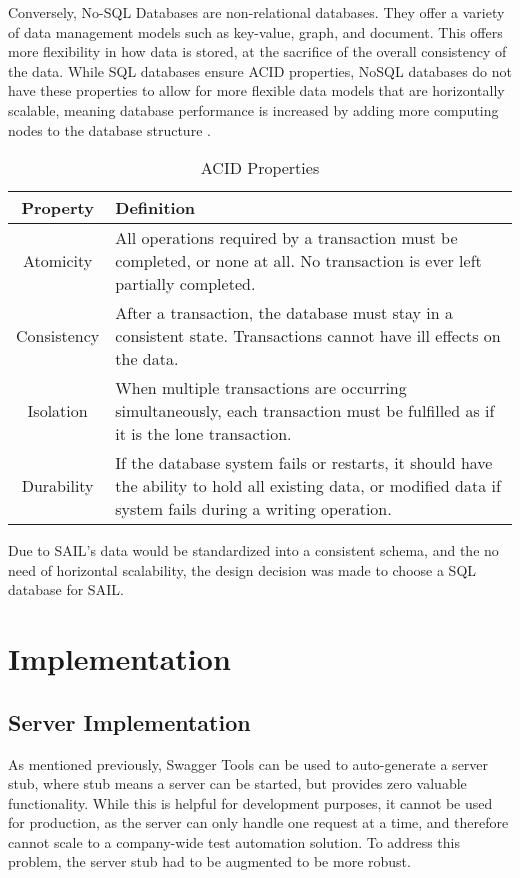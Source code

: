 \documentclass[10pt, titlepage, onecolumn, openany]{article}
\begin{document}
Conversely, No-SQL Databases are non-relational databases. They offer a variety
of data management models such as key-value, graph, and document. This offers
more flexibility in how data is stored, at the sacrifice of the overall consistency
of the data. While SQL databases ensure ACID properties, NoSQL databases do not
have these properties to allow for more flexible data models that are horizontally
scalable, meaning database performance is increased by adding more computing nodes
to the database structure \cite{awsNoSql}.
\begin{singlespace}
\begin{table}[H]
\caption{ACID Properties}
\centering
\begin{tabular}{|c|p{9cm}|}
    \hline
    \textbf{Property} & \textbf{Definition} \\
    \hline
    Atomicity & All operations required by a transaction must be completed, or
    none at all. No transaction is ever left partially completed. \\
    \hline
    Consistency & After a transaction, the database must stay in a consistent state.
    Transactions cannot have ill effects on the data. \\
    \hline
    Isolation & When multiple transactions are occurring simultaneously, each
    transaction must be fulfilled as if it is the lone transaction. \\
    \hline
    Durability &  If the database system fails or restarts, it should have the
    ability to hold all existing data, or modified data if system fails during a
    writing operation. \\
    \hline
\end{tabular}
\label{ACID}
\end{table}
\end{singlespace}

Due to SAIL's data would be standardized into a consistent schema, and the no need
of horizontal scalability, the design decision was made to choose a SQL database for SAIL.


\clearpage
\section{Implementation}
\subsection{Server Implementation}
As mentioned previously, Swagger Tools can be used to auto-generate
a server stub, where stub means a server can be started, but provides zero
valuable functionality. While this is helpful for development purposes, it cannot
be used for production, as the server can only handle one request at a
time, and therefore cannot scale to a company-wide test automation solution.
To address this problem, the server stub had to be augmented to be more
robust.
\end{document}
